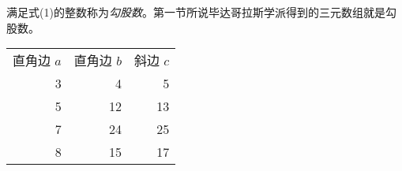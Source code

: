 \documentclass[xcolor=table]{beamer}
\begin{document}
\begin{frame}
	满足式(1)的整数称为\emph{勾股数}。第一节所说毕达哥拉斯学派得到的三元数组就是勾股数。
	

	\begin{tabular}{rrr}
		\rowcolor{gray} 直角边 $a$ & 直角边 $b$ & 斜边 $c$\\
		3 & 4 & 5 \\	
		5 & 12 & 13 \\	
		7 & 24 & 25 \\	
		8 & 15 & 17 \\	
	\end{tabular}
\end{frame}


\begin{frame}

\end{frame}
\end{document}
